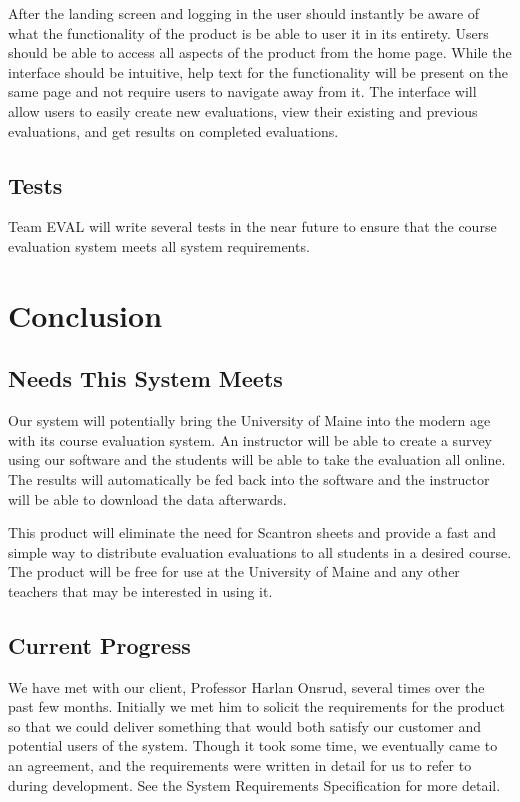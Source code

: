 \documentclass{article}
\begin{document}
After the landing screen and logging in the user should instantly be aware of what the functionality of the product is be able to user it in its entirety.  Users should be able to access all aspects of the product from the home page.  While the interface should be intuitive, help text for the functionality will be present on the same page and not require users to navigate away from it.  The interface will allow users to easily create new evaluations, view their existing and previous evaluations, and get results on completed evaluations.     

\subsection{Tests}

Team EVAL will write several tests in the near future to ensure that the course evaluation system meets all system requirements.

\section{Conclusion}

\subsection{Needs This System Meets}
Our system will potentially bring the University of Maine into the modern age with its course evaluation system. An instructor will be able to create a survey using our software and the students will be able to take the evaluation all online. The results will automatically be fed back into the software and the instructor will be able to download the data afterwards.

This product will eliminate the need for Scantron sheets and provide a fast and simple way to distribute evaluation evaluations to all students in a desired course. The product will be free for use at the University of Maine and any other teachers that may be interested in using it. 
\subsection{Current Progress}

We have met with our client, Professor Harlan Onsrud, several times over the past few months. Initially we met him to solicit the requirements for the product so that we could deliver something that would both satisfy our customer and potential users of the system. Though it took some time, we eventually came to an agreement, and the requirements were written in detail for us to refer to during development. See the System Requirements Specification for more detail.
	
\end{document}
